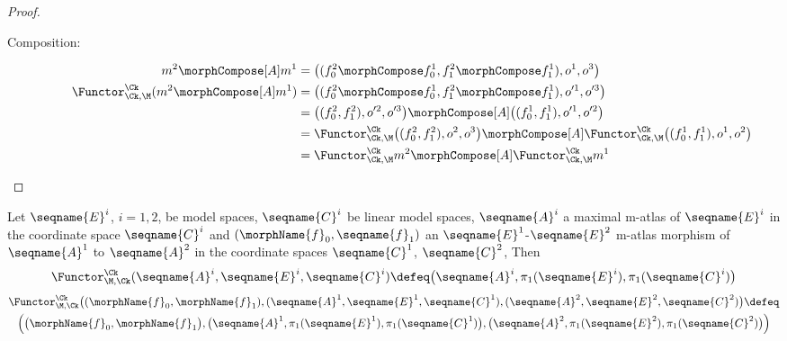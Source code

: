 \documentclass{article}
\begin{document}
\begin{theorem}
\begin{proof}
\begin{description}
\item[Composition:]
\begin{align*}
  m^2 \morphCompose[A] m^1
  &=
  \bigl (
    (f_0^2 \morphCompose f_0^1, f_1^2 \morphCompose f_1^1),
    o^1,
    o^3
  \bigr )
\\*
  \Functor^\Ck_{\Ck,\M} (m^2 \morphCompose[A] m^1)
  &=
  \bigl (
    (f_0^2 \morphCompose f_0^1, f_1^2 \morphCompose f_1^1),
    o'^1,
    o'^3
  \bigr )
\\*
  &=
  \bigl (
    (f_0^2, f_1^2),
    o'^2,
    o'^3
  \bigr ) \morphCompose[A]
  \bigl (
    (f_0^1, f_1^1),
    o'^1,
    o'^2
  \bigr )
\\*
  &=
    \Functor^\Ck_{\Ck,\M}
      \bigl (
        (f_0^2, f_1^2),
        o^2,
        o^3
      \bigr ) \morphCompose[A]
    \Functor^\Ck_{\Ck,\M}
      \bigl (
        (f_0^1, f_1^1),
        o^1,
        o^2
      \bigr )
\\*
  &=
  \Functor^\Ck_{\Ck,\M} m^2 \morphCompose[A] \Functor^\Ck_{\Ck,\M} m^1
\end{align*}
\end{description}
\end{proof}
\end{theorem}

\begin{definition}
\label{def:Func-M-Ck}
Let $\seqname{E}^i$, $i=1,2$, be model spaces, $\seqname{C}^i$ be linear
model spaces, $\seqname{A}^i$ a maximal m-atlas of $\seqname{E}^i$ in
the coordinate space $\seqname{C}^i$ and $(\morphName{f}_0,
\seqname{f}_1)$ an $\seqname{E}^1$-$\seqname{E}^2$ m-atlas morphism of
$\seqname{A}^1$ to $\seqname{A}^2$ in the coordinate spaces
$\seqname{C}^1$, $\seqname{C}^2$, Then
\begin{equation}
\Functor^\Ck_{\M,\Ck} (\seqname{A}^i, \seqname{E}^i, \seqname{C}^i)
\defeq
  \bigl (
     \seqname{A}^i,
     \pi_1(\seqname{E}^i),
     \pi_1(\seqname{C}^i)
   \bigr )
\end{equation}
\begin{multline}
\Functor^\Ck_{\M,\Ck}
  \bigl (
    (
      \morphName{f}_0,
      \morphName{f}_1
    ),
    (\seqname{A}^1, \seqname{E}^1, \seqname{C}^1),
    (\seqname{A}^2, \seqname{E}^2, \seqname{C}^2)
  \bigr )
\defeq \\
  \Bigl (
    \bigl (
      \morphName{f}_0,
      \morphName{f}_1
    \bigr ),
    \bigl ( \seqname{A}^1, \pi_1(\seqname{E}^1), \pi_1(\seqname{C}^1) \bigr ),
    \bigl ( \seqname{A}^2, \pi_1(\seqname{E}^2), \pi_1(\seqname{C}^2) \bigr )
  \Bigr )
\end{multline}
\end{definition}
\end{document}
